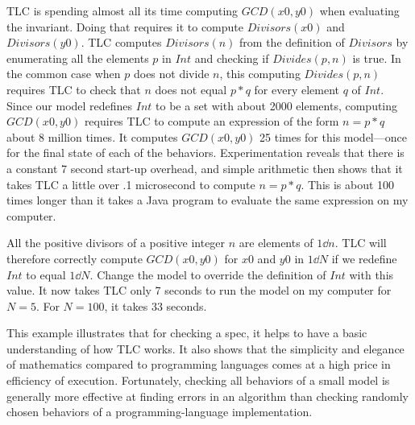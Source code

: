\documentclass[fleqn,leqno]{article}
\begin{document}
TLC is spending almost all its time computing $GCD(x0, y0)$ when
evaluating the invariant.  Doing that requires it to compute
$Divisors(x0)$ and $Divisors(y0)$.  TLC computes $Divisors(n)$ from
the definition of $Divisors$ by enumerating all the elements $p$ in
$Int$ and checking if $Divides(p,n)$ is true.  In the common case when
$p$ does not divide $n$, this computing $Divides(p,n)$ requires TLC to
check that $n$ does not equal $p*q$ for every element $q$ of $Int$.
Since our model redefines $Int$ to be a set with about 2000 elements,
computing $GCD(x0, y0)$ requires TLC to compute an expression of the
form $n=p*q$ about 8 million times.  It computes $GCD(x0, y0)$ 25
times for this model---once for the final state of each of the
behaviors.  Experimentation reveals that there is a constant 7 second
start-up overhead, and simple arithmetic then shows that it takes TLC
a little over .1 microsecond to compute $n=p*q$.  This is about 100
times longer than it takes a Java program to evaluate the same
expression on my computer.

All the positive divisors of a positive integer $n$ are elements of
$1\dd n$.  TLC will therefore correctly compute $GCD(x0,y0)$ for $x0$
and $y0$ in $1\dd N$ if we redefine $Int$ to equal $1\dd N$.  Change
the model to override the definition of $Int$ with this value.  It now
takes TLC only 7 seconds to run the model on my computer for $N=5$.
For $N=100$, it takes 33 seconds.  

This example illustrates that for checking a spec, it helps to have a
basic understanding of how TLC works.  It also shows that the
simplicity and elegance of mathematics compared to programming
languages comes at a high price in efficiency of execution.
Fortunately, checking all behaviors of a small model is generally more
effective at finding errors in an algorithm than checking randomly
chosen behaviors of a programming-language implementation.

\bigskip
\end{document}
